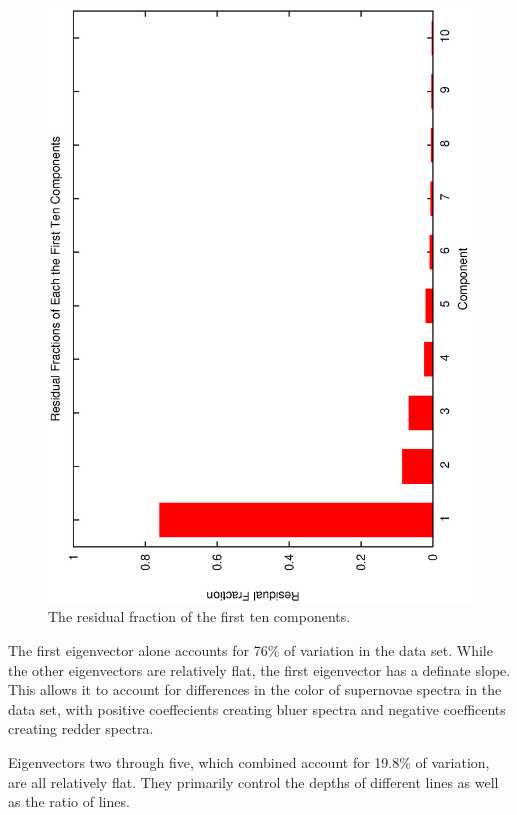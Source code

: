 \begin{figure}[htp]
\begin{center}
\includegraphics[angle=-90,scale=0.66]{./figures/hand_made/residual_fraction.ps}
\end{center}
\caption{
The residual fraction of the first ten components.
}
\label{fig:residualfrac1-5}
\end{figure}



The first eigenvector alone accounts for 76\% of variation in the data set. While the other eigenvectors are relatively flat, the first eigenvector has a definate slope. This allows it to account for differences in the color of supernovae spectra in the data set, with positive coeffecients creating bluer spectra and negative coefficents creating redder spectra. 

Eigenvectors two through five, which combined account for 19.8\% of variation, are all relatively flat. They primarily control the depths of different lines as well as the ratio of lines.


